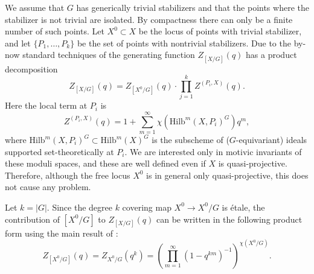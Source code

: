 \documentclass[11pt,a4paper]{amsart}
\theoremstyle{definition}
\begin{document}

We assume that $G$ has generically trivial stabilizers and that the points where the stabilizer is not trivial are isolated. By compactness there can only be a finite number of such points. Let $X^{0} \subset X$ be the locus of points with trivial stabilizer, and let $\{P_1,\dots,P_k\}$ be the set of points with nontrivial stabilizers.
Due to the by-now standard techniques of \cite{gusein2004power} the generating function $Z_{[X/G]}(q)$ has a product decomposition
\begin{equation} \label{eq:singsurface}
Z_{[X/G]}(q)= Z_{[X^0/G]}(q) \cdot \prod_{j=1}^k Z^{(P_i, X)}(q).
\end{equation}
Here the local term at $P_i$ is
\[Z^{(P_i, X)}(q) = 1+\sum_{m=1}^{\infty}  \chi( \mathrm{Hilb}^m(X,P_i)^G) q^m, \]
where $\mathrm{Hilb}^m(X,P_i)^G \subset \mathrm{Hilb}^m(X)^G$ is the subscheme of ($G$-equivariant) ideals supported set-theoretically at $P_i$. We are interested only in motivic invariants of these moduli spaces, and these are well defined even if $X$ is quasi-projective. Therefore, although the free locus $X^0$ is in general only quasi-projective, this does not cause any problem. 

Let $k=|G|$. Since the degree $k$ covering map $X^0 \to X^0/G$ is \'etale, the contribution of $[X^0/G]$ to $Z_{[X/G]}(q)$ can be written in the following product form using the main result of \cite{gottsche1990betti}:
\begin{equation} 
\label{eq:goettsche}
Z_{[X^0/G]}(q) = Z_{X^0/G}(q^k)= \left(\prod_{m=1}^{\infty}(1-q^{km})^{-1}\right)^{\chi(X^0/G)}.
\end{equation}
\end{document}
